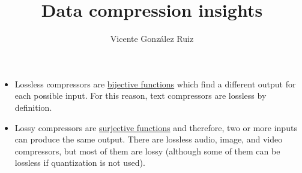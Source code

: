 
\title{Data compression insights}
\author{Vicente González Ruiz}

\maketitle


\begin{itemize}

\item Lossless compressors are
  \href{https://en.wikipedia.org/wiki/Bijection}{bijective functions}
  which find a different output for each possible input. For this
  reason, text compressors are lossless by definition.


\item Lossy compressors are
  \href{https://en.wikipedia.org/wiki/Surjective_function}{surjective
    functions} and therefore, two or more inputs can produce the same
  output. There are lossless audio, image, and video compressors, but
  most of them are lossy (although some of them can be lossless if
  quantization is not used).

  
\end{itemize}
